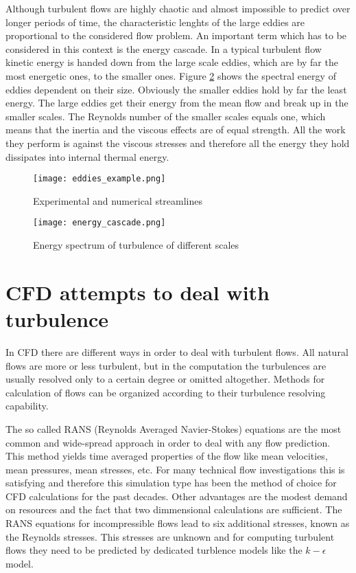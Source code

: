 Although turbulent flows are highly chaotic and almost impossible to predict over longer periods of time, the characteristic lenghts of the large eddies are proportional to the considered flow problem. An important term which has to be considered in this context is the energy cascade. In a typical turbulent flow kinetic energy is handed down from the large scale eddies, which are by far the most energetic ones, to the smaller ones. Figure \ref{fig:cascade} shows the spectral energy of eddies dependent on their size. Obviously the smaller eddies hold by far the least energy. The large eddies get their energy from the mean flow and break up in the smaller scales. The Reynolds number of the smaller scales equals one, which means that the inertia and the viscous effects are of equal strength. All the work they perform is against the viscous stresses and therefore all the energy they hold dissipates into internal thermal energy.

\begin{figure}[ht]
\centering
\texttt{[image: eddies\_example.png]}
\caption{Experimental and numerical streamlines}
\label{fig:example}
\end{figure}

\begin{figure}[ht]
\centering
\texttt{[image: energy\_cascade.png]}
\caption{Energy spectrum of turbulence of different scales}
\label{fig:cascade}
\end{figure}

\section{CFD attempts to deal with turbulence}
In CFD there are different ways in order to deal with turbulent flows. All natural flows are more or less turbulent, but in the computation the turbulences are usually resolved only to a certain degree or omitted altogether. Methods for calculation of flows can be organized according to their turbulence resolving capability.

The so called RANS (Reynolds Averaged Navier-Stokes) equations are the most common and wide-spread approach in order to deal with any flow prediction.
This method yields time averaged properties of the flow like mean velocities, mean pressures, mean stresses, etc. For many technical flow investigations this is satisfying and therefore this simulation type has been the method of choice for CFD calculations for the past decades. Other advantages are the modest demand on resources and the fact that two dimmensional calculations are sufficient.
The RANS equations for incompressible flows lead to six additional stresses, known as the Reynolds stresses. This stresses are unknown and for computing turbulent flows they need to be predicted by dedicated turblence models like the $k-\epsilon$ model.

